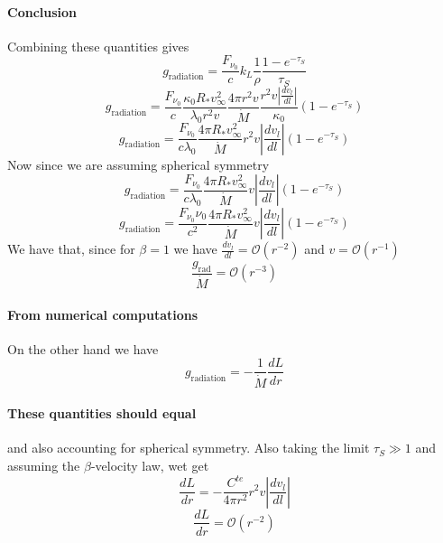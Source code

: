 \documentclass[../main/main.tex]{subfiles}
\begin{document}
\paragraph{Conclusion}
Combining these quantities gives
\begin{equation}
g_{\text{radiation}} = \frac{F_{\nu_0}}{c}  k_L \frac{1}{\rho }\frac{1- e^{-\tau_S}}{\tau_S}  
\end{equation}
\begin{equation}
g_{\text{radiation}} = 
\frac{F_{\nu_0}}{c} 
\frac{\kappa_0 R_* v_{\infty}^2}{\lambda_0 r^2 v} 
\frac{4 \pi r^2 v}{\dot{M}}  
\frac{r^2 v \left | \frac{dv_l}{dl} \right| }{\kappa_0} \left( 1- e^{-\tau_S} \right)
\end{equation}
\begin{equation}
\boxed{g_{\text{radiation}} = 
\frac{F_{\nu_0}}{c \lambda_0} 
\frac{4 \pi R_* v_{\infty}^2}{ \dot{M}} 
r^2 v \left | \frac{dv_l}{dl} \right|  \left( 1- e^{-\tau_S} \right)}
\end{equation}
Now since we are assuming spherical symmetry
\begin{equation}
\boxed{g_{\text{radiation}} = 
\frac{F_{\nu_0}}{c \lambda_0} 
\frac{4 \pi R_* v_{\infty}^2} {\dot{M}} 
v \left | \frac{dv_l}{dl} \right|  \left( 1- e^{-\tau_S} \right)}
\end{equation}
\begin{equation}
\boxed{g_{\text{radiation}} = 
\frac{F_{\nu_0} \nu_0}{c^2} 
\frac{4 \pi R_* v_{\infty}^2} {\dot{M}} 
v \left | \frac{dv_l}{dl} \right|  \left( 1- e^{-\tau_S} \right)}
\end{equation}
We have that, since for $\beta = 1$ we have $\frac{dv_l}{dl} = \mathcal{O}(r^{-2})$ and $v = \mathcal{O}(r^{-1})$
\begin{equation}
\frac{g_{\text{rad}}}{\dot{M}} = \mathcal{O}(r^{-3})
\end{equation}

\paragraph{From numerical computations}
On the other hand we have
\begin{equation}
\boxed{g_{\text{radiation}} = - \frac{1}{\dot{M}}\frac{dL}{dr}}
\end{equation}

\paragraph{These quantities should equal} and also accounting for spherical symmetry. Also taking the limit $\tau_S \gg 1$ and assuming the $\beta$-velocity law, wet get
\begin{equation}
\frac{dL}{dr} = -\frac{C^{te}}{4 \pi r^2} r^2 v 
\left| \frac{dv_l}{dl} \right|
\end{equation}
\begin{equation}
\frac{dL}{dr} = \mathcal{O}(r^{-2})
\label{scaling_relation}
\end{equation}
\end{document}
